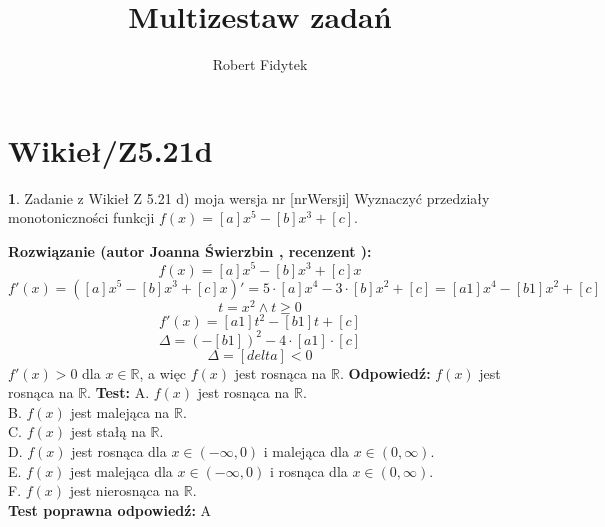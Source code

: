 \documentclass[12pt, a4paper]{article}
\title{Multizestaw zadań}
\author{Robert Fidytek}
\date{}
\theoremstyle{definition} %
\newtheorem{zad}{}
\newcommand{\kategoria}[1]{\section{#1}} %
\newcommand{\zadStart}[1]{\begin{zad}#1\newline} %
\newcommand{\zadStop}{\end{zad}}   %
\newcommand{\rozwStart}[2]{\noindent \textbf{Rozwiązanie (autor #1 , recenzent #2): }\newline} %
\newcommand{\rozwStop}{\newline}                                            %
\newcommand{\odpStart}{\noindent \textbf{Odpowiedź:}\newline}    %
\newcommand{\odpStop}{\newline}                                             %
\newcommand{\testStart}{\noindent \textbf{Test:}\newline} %
\newcommand{\testStop}{\newline} %
\newcommand{\kluczStart}{\noindent \textbf{Test poprawna odpowiedź:}\newline} %
\newcommand{\kluczStop}{\newline} %
\begin{document}
\maketitle


\kategoria{Wikieł/Z5.21d}
\zadStart{Zadanie z Wikieł Z 5.21 d) moja wersja nr [nrWersji]}
Wyznaczyć przedziały monotoniczności funkcji $f(x)=[a]x^5-[b]x^3+[c]$.
\zadStop
\rozwStart{Joanna Świerzbin}{}
$$f(x)=[a]x^5-[b]x^3+[c]x$$
$$f'(x)=\left([a]x^5-[b]x^3+[c]x\right)'= 5\cdot[a]x^4-3\cdot[b]x^2+[c]= [a1]x^4-[b1]x^2+[c]$$
$$t=x^2 \land t \geq 0  $$
$$f'(x)= [a1]t^2-[b1]t+[c]$$
$$\Delta=(-[b1])^2-4\cdot[a1]\cdot[c]$$
$$\Delta=[delta] <0 $$
$f'(x) > 0$ dla $ x\in \mathbb{R} $,
a więc $f(x)$ jest rosnąca na $\mathbb{R}$.
\rozwStop
\odpStart
 $f(x)$ jest rosnąca na $\mathbb{R}$.
\odpStop
\testStart
A. $f(x)$ jest rosnąca na $\mathbb{R}$. \\
B. $f(x)$ jest malejąca na $\mathbb{R}$.\\
C. $f(x)$ jest stałą na $\mathbb{R}$.\\
D. $f(x)$ jest rosnąca dla $x\in (-\infty, 0)$ i malejąca dla  $x\in (0, \infty)$.\\
E. $f(x)$ jest malejąca dla $x\in (-\infty, 0)$ i rosnąca dla  $x\in (0, \infty)$.\\
F. $f(x)$ jest nierosnąca na $\mathbb{R}$.\\
\testStop
\kluczStart
A
\kluczStop
\end{document}
